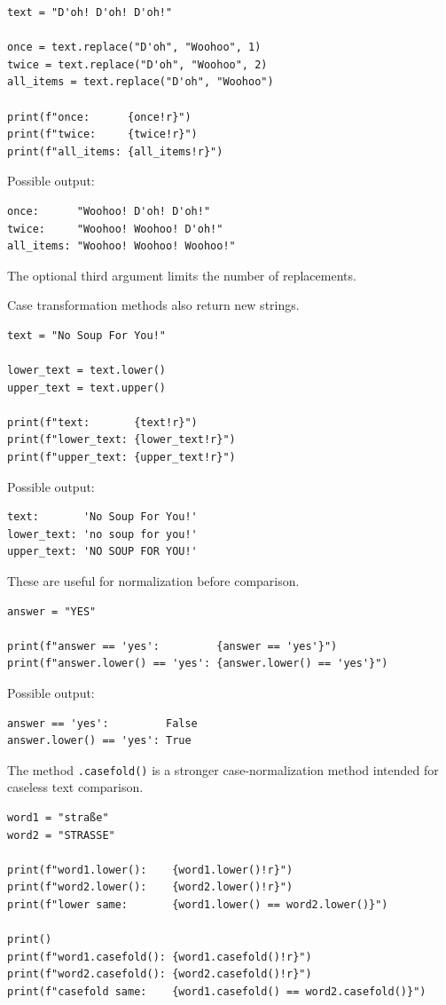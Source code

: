 \begin{verbatim}
text = "D'oh! D'oh! D'oh!"

once = text.replace("D'oh", "Woohoo", 1)
twice = text.replace("D'oh", "Woohoo", 2)
all_items = text.replace("D'oh", "Woohoo")

print(f"once:      {once!r}")
print(f"twice:     {twice!r}")
print(f"all_items: {all_items!r}")
\end{verbatim}

Possible output:

\begin{verbatim}
once:      "Woohoo! D'oh! D'oh!"
twice:     "Woohoo! Woohoo! D'oh!"
all_items: "Woohoo! Woohoo! Woohoo!"
\end{verbatim}

The optional third argument limits the number of replacements.

Case transformation methods also return new strings.

\begin{verbatim}
text = "No Soup For You!"

lower_text = text.lower()
upper_text = text.upper()

print(f"text:       {text!r}")
print(f"lower_text: {lower_text!r}")
print(f"upper_text: {upper_text!r}")
\end{verbatim}

Possible output:

\begin{verbatim}
text:       'No Soup For You!'
lower_text: 'no soup for you!'
upper_text: 'NO SOUP FOR YOU!'
\end{verbatim}

These are useful for normalization before comparison.

\begin{verbatim}
answer = "YES"

print(f"answer == 'yes':         {answer == 'yes'}")
print(f"answer.lower() == 'yes': {answer.lower() == 'yes'}")
\end{verbatim}

Possible output:

\begin{verbatim}
answer == 'yes':         False
answer.lower() == 'yes': True
\end{verbatim}

The method \texttt{.casefold()} is a stronger case-normalization method intended for caseless text comparison.

\begin{verbatim}
word1 = "straße"
word2 = "STRASSE"

print(f"word1.lower():    {word1.lower()!r}")
print(f"word2.lower():    {word2.lower()!r}")
print(f"lower same:       {word1.lower() == word2.lower()}")

print()
print(f"word1.casefold(): {word1.casefold()!r}")
print(f"word2.casefold(): {word2.casefold()!r}")
print(f"casefold same:    {word1.casefold() == word2.casefold()}")
\end{verbatim}

